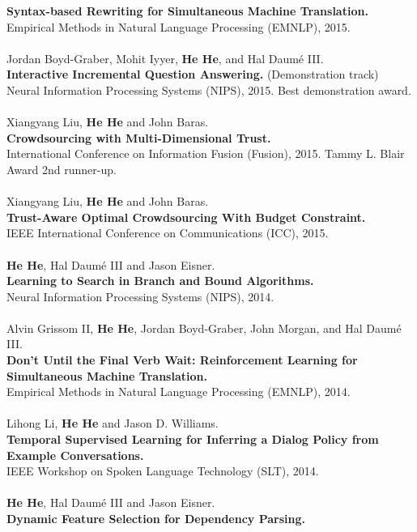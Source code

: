 \documentclass[a4paper,11pt]{article}
\begin{document}
{\bf Syntax-based Rewriting for Simultaneous Machine Translation.}\\
Empirical Methods in Natural Language Processing (EMNLP), 2015.\\
\\
Jordan Boyd-Graber, Mohit Iyyer, {\bf He He}, and Hal Daum\'e III.\\
{\bf Interactive Incremental Question Answering.} (Demonstration track)\\
Neural Information Processing Systems (NIPS), 2015. 
Best demonstration award.\\
\\
Xiangyang Liu, {\bf He He} and John Baras.\\
{\bf Crowdsourcing with Multi-Dimensional Trust.}\\
International Conference on Information Fusion (Fusion), 2015.
Tammy L. Blair Award 2nd runner-up.\\
\\
Xiangyang Liu, {\bf He He} and John Baras.\\
{\bf Trust-Aware Optimal Crowdsourcing With Budget Constraint.}\\
IEEE International Conference on Communications (ICC), 2015.\\
\\
{\bf He He}, Hal Daum\'e III and Jason Eisner. \\
{\bf Learning to Search in Branch and Bound Algorithms.}\\
Neural Information Processing Systems (NIPS), 2014.\\
\\
Alvin Grissom II, {\bf He He}, Jordan Boyd-Graber, John Morgan, and Hal Daum\'e III. \\
{\bf Don't Until the Final Verb Wait: Reinforcement Learning for Simultaneous Machine Translation.}\\
Empirical Methods in Natural Language Processing (EMNLP), 2014.\\
\\
Lihong Li, {\bf He He} and Jason D. Williams. \\
{\bf Temporal Supervised Learning for Inferring a Dialog Policy from Example Conversations.}\\
IEEE Workshop on Spoken Language Technology (SLT), 2014.\\
\\
{\bf He He}, Hal Daum\'e III and Jason Eisner.\\
{\bf Dynamic Feature Selection for Dependency Parsing.}\\ 
\end{document}
